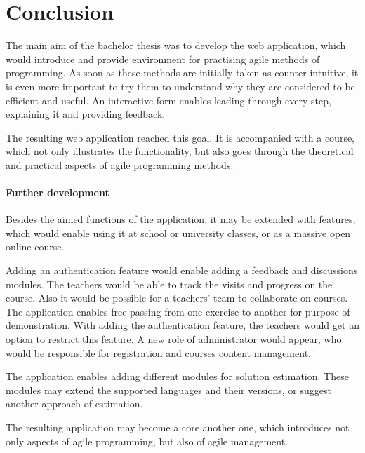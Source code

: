 \chapter*{Conclusion}  %

The main aim of the bachelor thesis was to develop the web application, which would introduce and provide environment for practising agile methods of programming. As soon as these methods are initially taken as counter intuitive, it is even more important to try them to understand why they are considered to be efficient and useful. An interactive form enables leading through every step, explaining it and providing feedback.

The resulting web application reached this goal. It is accompanied with a course, which not only illustrates the functionality, but also goes through the theoretical and practical aspects of agile programming methods.

    \subsubsection{Further development}
    Besides the aimed functions of the application, it may be extended with features, which would enable using it at school or university classes, or as a massive open online course.

    Adding an authentication feature would enable adding a feedback and discussions modules. The teachers would be able to track the visits and progress on the course. Also it would be possible for a teachers' team to collaborate on courses. The application enables free passing from one exercise to another for purpose of demonstration. With adding the authentication feature, the teachers would get an option to restrict this feature. A new role of administrator would appear, who would be responsible for registration and courses content management.
    
    The application enables adding different modules for solution estimation. These modules may extend the supported languages and their versions, or suggest another approach of estimation.
    
    The resulting application may become a core another one, which introduces not only aspects of agile programming, but also of agile management.